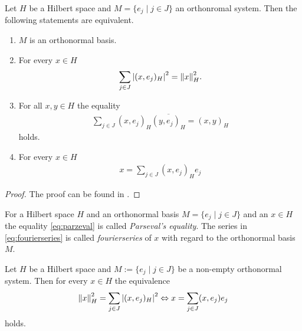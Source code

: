 \begin{theorem}
	Let $H$ be a Hilbert space and $M = \{e_j \mid j \in J\}$ an orthonromal system. Then the following statements are equivalent.
	\begin{enumerate}
		\item $M$ is an orthonormal basis.
		
		\item For every $x \in H$
		\begin{align}\label{eq:parzeval}
		\sum_{j \in J} \vbraces{(x, e_j)_H}^2 = \norm[H]{x}^2.
		\end{align}
		
		\item For all $x,y \in H$ the equality
		\begin{align*}
			\sum_{j \in J} (x, e_j)_H \overline{(y,e_j)_H} = (x,y)_H
		\end{align*}
		holds.
		
		\item For every $x \in H$  
		\begin{align} \label{eq:fourierseries}
		x = \sum_{j \in J} (x, e_j)_H e_j
		\end{align}
	\end{enumerate} 
\end{theorem}


\begin{proof}
	The proof can be found in \cite[p. 54]{FAna1}.
\end{proof}


\begin{definition}
	For a Hilbert space $H$ and an orthonormal basis $M = \{e_j \mid j \in J\}$ and an $x \in H$ the equality \eqref{eq:parzeval} is called \textit{Parseval's equality}. The series in \eqref{eq:fourierseries} is called \textit{fourierseries} of $x$ with regard to the orthonormal basis $M$. 
\end{definition}

\begin{lemma}
	Let $H$ be a Hilbert space and $M := \{e_j \mid j \in J\}$ be a non-empty orthonormal system. Then for every $x \in H$ the equivalence
	\begin{align}
		\norm[H]{x}^2 = \sum_{j \in J} \vbraces{(x, e_j)_H}^2 \Leftrightarrow x = \sum_{j \in J} (x,e_j) e_j \label{eq:parceval_to_fourier}
	\end{align}
	holds.
\end{lemma}

